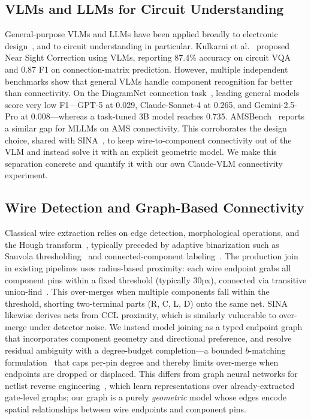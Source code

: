 \documentclass[conference]{IEEEtran}
\begin{document}
\subsection{VLMs and LLMs for Circuit Understanding}
\label{sec:vlm_connectivity}
General-purpose VLMs and LLMs have been applied broadly to electronic design~\cite{llm4eda2024}, and to circuit understanding in particular. Kulkarni et al.~\cite{kulkarni2025enhancing} proposed Near Sight Correction using VLMs, reporting 87.4\% accuracy on circuit VQA and 0.87 F1 on connection-matrix prediction. However, multiple independent benchmarks show that general VLMs handle component recognition far better than connectivity. On the DiagramNet connection task~\cite{diagramnet2026}, leading general models score very low F1---GPT-5 at 0.029, Claude-Sonnet-4 at 0.265, and Gemini-2.5-Pro at 0.008---whereas a task-tuned 3B model reaches 0.735. AMSBench~\cite{amsbench2025} reports a similar gap for MLLMs on AMS connectivity. This corroborates the design choice, shared with SINA~\cite{sina2026}, to keep wire-to-component connectivity out of the VLM and instead solve it with an explicit geometric model. We make this separation concrete and quantify it with our own Claude-VLM connectivity experiment.

\subsection{Wire Detection and Graph-Based Connectivity}
Classical wire extraction relies on edge detection, morphological operations, and the Hough transform~\cite{duda1972hough}, typically preceded by adaptive binarization such as Sauvola thresholding~\cite{sauvola2000} and connected-component labeling~\cite{he2017ccl}. The production join in existing pipelines uses radius-based proximity: each wire endpoint grabs all component pins within a fixed threshold (typically 30px), connected via transitive union-find~\cite{tarjan1975union}. This over-merges when multiple components fall within the threshold, shorting two-terminal parts (R, C, L, D) onto the same net. SINA~\cite{sina2026} likewise derives nets from CCL proximity, which is similarly vulnerable to over-merge under detector noise. We instead model joining as a typed endpoint graph that incorporates component geometry and directional preference, and resolve residual ambiguity with a degree-budget completion---a bounded $b$-matching formulation~\cite{kuhn1955,schrijver2003combinatorial} that caps per-pin degree and thereby limits over-merge when endpoints are dropped or displaced. This differs from graph neural networks for netlist reverse engineering~\cite{alrahis2021gnn}, which learn representations over already-extracted gate-level graphs; our graph is a purely \emph{geometric} model whose edges encode spatial relationships between wire endpoints and component pins.
\end{document}
